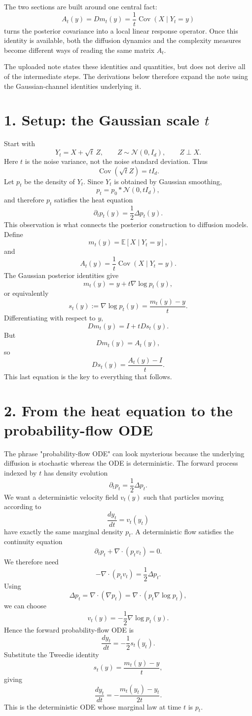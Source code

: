 \documentclass{article}
\begin{document}
The two sections are built around one central fact:
\[
A_t(y) = Dm_t(y) = \frac1t\operatorname{Cov}(X\mid Y_t=y)
\]
turns the posterior covariance into a local linear response operator. Once this identity is available, both the diffusion dynamics and the complexity measures become different ways of reading the same matrix $A_t$.

The uploaded note states these identities and quantities, but does not derive all of the intermediate steps. The derivations below therefore expand the note using the Gaussian-channel identities underlying it.

\section*{1. Setup: the Gaussian scale $t$}
Start with
\[
Y_t = X + \sqrt{t}\,Z,
\qquad
Z\sim\mathcal N(0,I_d),
\qquad Z\perp X.
\]
Here $t$ is the noise variance, not the noise standard deviation.
Thus
\[
\operatorname{Cov}(\sqrt t Z) = tI_d.
\]
Let $p_t$ be the density of $Y_t$. Since $Y_t$ is obtained by Gaussian smoothing,
\[
p_t = p_0 * \mathcal N(0,tI_d),
\]
and therefore $p_t$ satisfies the heat equation
\[
\boxed{
\partial_t p_t(y) = \frac12\Delta p_t(y).
}
\]
This observation is what connects the posterior construction to diffusion models.
Define
\[
m_t(y) = \mathbb E[X\mid Y_t=y],
\]
and
\[
A_t(y) = \frac1t\operatorname{Cov}(X\mid Y_t=y).
\]
The Gaussian posterior identities give
\[
m_t(y) = y + t\nabla\log p_t(y),
\]
or equivalently
\[
\boxed{
s_t(y) := \nabla\log p_t(y) = \frac{m_t(y)-y}{t}.
}
\]
Differentiating with respect to $y$,
\[
Dm_t(y) = I + tDs_t(y).
\]
But
\[
Dm_t(y) = A_t(y),
\]
so
\[
\boxed{
Ds_t(y) = \frac{A_t(y)-I}{t}.
}
\]
This last equation is the key to everything that follows.

\section*{2. From the heat equation to the probability-flow ODE}
The phrase "probability-flow ODE" can look mysterious because the underlying diffusion is stochastic whereas the ODE is deterministic.
The forward process indexed by $t$ has density evolution
\[
\partial_t p_t = \frac12\Delta p_t.
\]
We want a deterministic velocity field $v_t(y)$ such that particles moving according to
\[
\frac{dy_t}{dt} = v_t(y_t)
\]
have exactly the same marginal density $p_t$.
A deterministic flow satisfies the continuity equation
\[
\partial_t p_t + \nabla\cdot(p_t v_t) = 0.
\]
We therefore need
\[
-\nabla\cdot(p_t v_t) = \frac12\Delta p_t.
\]
Using
\[
\Delta p_t = \nabla\cdot(\nabla p_t) = \nabla\cdot(p_t\nabla\log p_t),
\]
we can choose
\[
v_t(y) = -\frac12\nabla\log p_t(y).
\]
Hence the forward probability-flow ODE is
\[
\boxed{
\frac{dy_t}{dt} = -\frac12s_t(y_t).
}
\]
Substitute the Tweedie identity
\[
s_t(y) = \frac{m_t(y)-y}{t},
\]
giving
\[
\boxed{
\frac{dy_t}{dt} = -\frac{m_t(y_t)-y_t}{2t}.
}
\]
This is the deterministic ODE whose marginal law at time $t$ is $p_t$.
\end{document}
